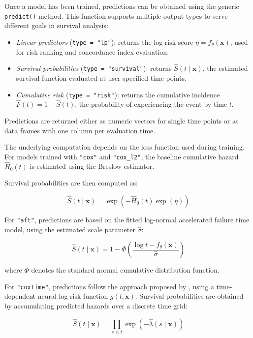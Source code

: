 Once a  model has been trained, predictions can be obtained using the generic \texttt{predict()} method. This function supports multiple output types to serve different goals in survival analysis:

\begin{itemize}
\item
  \emph{Linear predictors} (\texttt{type\ =\ "lp"}): returns the log-risk score \(\eta = f_\theta(\mathbf{x})\), used for risk ranking and concordance index evaluation.
\item
  \emph{Survival probabilities} (\texttt{type\ =\ "survival"}): returns \(\hat{S}(t \mid \mathbf{x})\), the estimated survival function evaluated at user-specified time points.
\item
  \emph{Cumulative risk} (\texttt{type\ =\ "risk"}): returns the cumulative incidence \(\hat{F}(t) = 1 - \hat{S}(t)\), the probability of experiencing the event by time \(t\).
\end{itemize}

Predictions are returned either as numeric vectors for single time points or as data frames with one column per evaluation time.

The underlying computation depends on the loss function used during training. For models trained with \texttt{"cox"} and \texttt{"cox\_l2"}, the baseline cumulative hazard \(\hat{H}_0(t)\) is estimated using the Breslow estimator.

Survival probabilities are then computed as:

\[
\hat{S}(t \mid \mathbf{x})
=
\exp\!\left(-\hat{H}_0(t)\exp(\eta)\right)
\]

For \texttt{"aft"}, predictions are based on the fitted log-normal accelerated failure time model, using the estimated scale parameter \(\hat{\sigma}\):

\[
\hat{S}(t \mid \mathbf{x})
= 1 - \Phi\!\left(
\frac{\log t - f_\theta(\mathbf{x})}{\hat{\sigma}}
\right)
\]

where \(\Phi\) denotes the standard normal cumulative distribution function.

For \texttt{"coxtime"}, predictions follow the approach proposed by \citep{kvamme2019time}, using a time-dependent neural log-risk function \(g(t,\mathbf{x})\). Survival probabilities are obtained by accumulating predicted hazards over a discrete time grid:

\[
\hat{S}(t \mid \mathbf{x})
= \prod_{s \le t}
\exp\!\left(-\hat{\lambda}(s \mid \mathbf{x})\right)
\]

